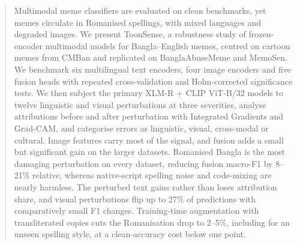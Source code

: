 \begin{abstract}
Multimodal meme classifiers are evaluated on clean benchmarks, yet memes circulate in Romanised spellings, with
mixed languages and degraded images. We present ToonSense, a robustness study of frozen-encoder multimodal models
for Bangla--English memes, centred on cartoon memes from CMBan and replicated on BanglaAbuseMeme and MemoSen. We
benchmark six multilingual text encoders, four image encoders and five fusion heads with repeated cross-validation
and Holm-corrected significance tests. We then subject the primary XLM-R + CLIP ViT-B/32 models to twelve
linguistic and visual perturbations at three severities, analyse attributions before and after perturbation with
Integrated Gradients and Grad-CAM, and categorise errors as linguistic, visual, cross-modal or cultural. Image
features carry most of the signal, and fusion adds a small but significant gain on the larger datasets. Romanised
Bangla is the most damaging perturbation on every dataset, reducing fusion macro-F1 by 8--21\% relative, whereas
native-script spelling noise and code-mixing are nearly harmless. The perturbed text gains rather than loses
attribution share, and visual perturbations flip up to 27\% of predictions with comparatively small F1 changes.
Training-time augmentation with transliterated copies cuts the Romanisation drop to 2--5\%, including for an unseen
spelling style, at a clean-accuracy cost below one point.
\end{abstract}
